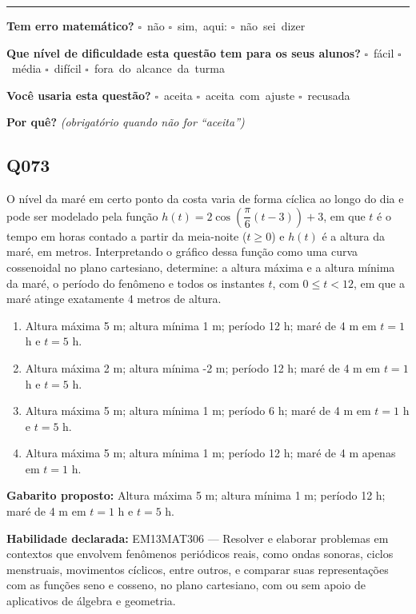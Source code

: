 \documentclass[11pt,a4paper]{article}
\begin{document}
\noindent\rule{\linewidth}{0.4pt}
\textbf{Tem erro matemático?}\quad
\mbox{$\square$~não} \quad \mbox{$\square$~sim, aqui:} \underline{\hspace{5cm}}
\quad \mbox{$\square$~não sei dizer}

\textbf{Que nível de dificuldade esta questão tem para os seus alunos?}\quad
\mbox{$\square$~fácil} \quad \mbox{$\square$~média} \quad
\mbox{$\square$~difícil} \quad \mbox{$\square$~fora do alcance da turma}

\textbf{Você usaria esta questão?}\quad
\mbox{$\square$~aceita} \quad \mbox{$\square$~aceita com ajuste} \quad
\mbox{$\square$~recusada}

\textbf{Por quê?} \emph{(obrigatório quando não for ``aceita'')}

\underline{\hspace{\linewidth}}

\underline{\hspace{\linewidth}}
\vspace{0.6em}

\begin{samepage}
\subsection*{Q073}
O nível da maré em certo ponto da costa varia de forma cíclica ao longo do dia e pode ser modelado pela função $h(t) = 2\cos\left(\dfrac{\pi}{6}(t-3)\right) + 3$, em que $t$ é o tempo em horas contado a partir da meia-noite ($t \ge 0$) e $h(t)$ é a altura da maré, em metros. Interpretando o gráfico dessa função como uma curva cossenoidal no plano cartesiano, determine: a altura máxima e a altura mínima da maré, o período do fenômeno e todos os instantes $t$, com $0 \le t < 12$, em que a maré atinge exatamente 4 metros de altura.
\begin{enumerate}[label=(\alph*),nosep,leftmargin=*]
\item Altura máxima 5 m; altura mínima 1 m; período 12 h; maré de 4 m em $t=1$ h e $t=5$ h.
\item Altura máxima 2 m; altura mínima -2 m; período 12 h; maré de 4 m em $t=1$ h e $t=5$ h.
\item Altura máxima 5 m; altura mínima 1 m; período 6 h; maré de 4 m em $t=1$ h e $t=5$ h.
\item Altura máxima 5 m; altura mínima 1 m; período 12 h; maré de 4 m apenas em $t=1$ h.
\end{enumerate}

\textbf{Gabarito proposto:} Altura máxima 5 m; altura mínima 1 m; período 12 h; maré de 4 m em $t=1$ h e $t=5$ h.

\textbf{Habilidade declarada:} EM13MAT306 --- Resolver e elaborar problemas em contextos que envolvem fenômenos periódicos reais, como ondas sonoras, ciclos menstruais, movimentos cíclicos, entre outros, e comparar suas representações com as funções seno e cosseno, no plano cartesiano, com ou sem apoio de aplicativos de álgebra e geometria.
\end{samepage}
\end{document}
